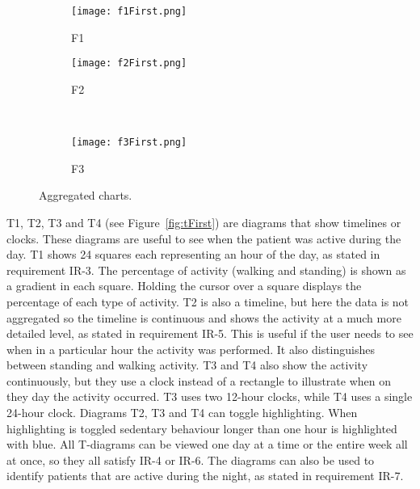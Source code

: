\clearpage

\begin{figure}[t]
  \centering
  \begin{subfigure}[b]{0.45\textwidth}
    \centering
    \texttt{[image: f1First.png]}
    \caption{F1}
  \end{subfigure}
  \begin{subfigure}[b]{0.45\textwidth}
    \centering
    \texttt{[image: f2First.png]}
    \caption{F2}
  \end{subfigure}
  \\
  \begin{subfigure}[b]{0.45\textwidth}
    \centering
    \texttt{[image: f3First.png]}
    \caption{F3}
  \end{subfigure}
  \caption[First version of F1, F2, and F3]{Aggregated charts.}
  \label{fig:fFirst}
\end{figure}

T1, T2, T3 and T4 (see Figure~\ref{fig:tFirst}) are diagrams that show timelines or clocks. These diagrams are useful to see when the patient was active during the day. T1 shows 24 squares each representing an hour of the day, as stated in requirement IR-3. The percentage of activity (walking and standing) is shown as a gradient in each square. Holding the cursor over a square displays the percentage of each type of activity. T2 is also a timeline, but here the data is not aggregated so the timeline is continuous and shows the activity at a much more detailed level, as stated in requirement IR-5. This is useful if the user needs to see when in a particular hour the activity was performed. It also distinguishes between standing and walking activity. T3 and T4 also show the activity continuously, but they use a clock instead of a rectangle to illustrate when on they day the activity occurred. T3 uses two 12-hour clocks, while T4 uses a single 24-hour clock. Diagrams T2, T3 and T4 can toggle highlighting. When highlighting is toggled sedentary behaviour longer than one hour is highlighted with blue. All T-diagrams can be viewed one day at a time or the entire week all at once, so they all satisfy IR-4 or IR-6. The diagrams can also be used to identify patients that are active during the night, as stated in requirement IR-7.

